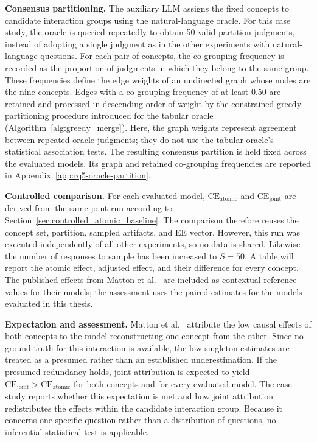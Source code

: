 \noindent\textbf{Consensus partitioning.} The auxiliary LLM assigns the fixed concepts to candidate interaction groups using the natural-language oracle. For this case study, the oracle is queried repeatedly to obtain 50 valid partition judgments, instead of adopting a single judgment as in the other experiments with natural-language questions. For each pair of concepts, the co-grouping frequency is recorded as the proportion of judgments in which they belong to the same group. These frequencies define the edge weights of an undirected graph whose nodes are the nine concepts. Edges with a co-grouping frequency of at least $0.50$ are retained and processed in descending order of weight by the constrained greedy partitioning procedure introduced for the tabular oracle (Algorithm~\ref{alg:greedy_merge}). Here, the graph weights represent agreement between repeated oracle judgments; they do not use the tabular oracle's statistical association tests. The resulting consensus partition is held fixed across the evaluated models. Its graph and retained co-grouping frequencies are reported in Appendix~\ref{app:rq5-oracle-partition}.

\noindent\textbf{Controlled comparison.} For each evaluated model, $\mathrm{CE}_{\mathrm{atomic}}$ and $\mathrm{CE}_{\mathrm{joint}}$ are derived from the same joint run according to Section~\ref{sec:controlled_atomic_baseline}. The comparison therefore reuses the concept set, partition, sampled artifacts, and EE vector. However, this run was executed independently of all other experiments, so no data is shared. Likewise the number of responses to sample has been increased to $S=50$. A table will report the atomic effect, adjusted effect, and their difference for every concept. The published effects from Matton et al.~\cite{mattonWalkTalkMeasuring2024} are included as contextual reference values for their models; the assessment uses the paired estimates for the models evaluated in this thesis.

\noindent\textbf{Expectation and assessment.} Matton et al.~\cite{mattonWalkTalkMeasuring2024} attribute the low causal effects of both concepts to the model reconstructing one concept from the other. Since no ground truth for this interaction is available, the low singleton estimates are treated as a presumed rather than an established underestimation. If the presumed redundancy holds, joint attribution is expected to yield $\mathrm{CE}_{\mathrm{joint}} > \mathrm{CE}_{\mathrm{atomic}}$ for both concepts and for every evaluated model. The case study reports whether this expectation is met and how joint attribution redistributes the effects within the candidate interaction group. Because it concerns one specific question rather than a distribution of questions, no inferential statistical test is applicable.
